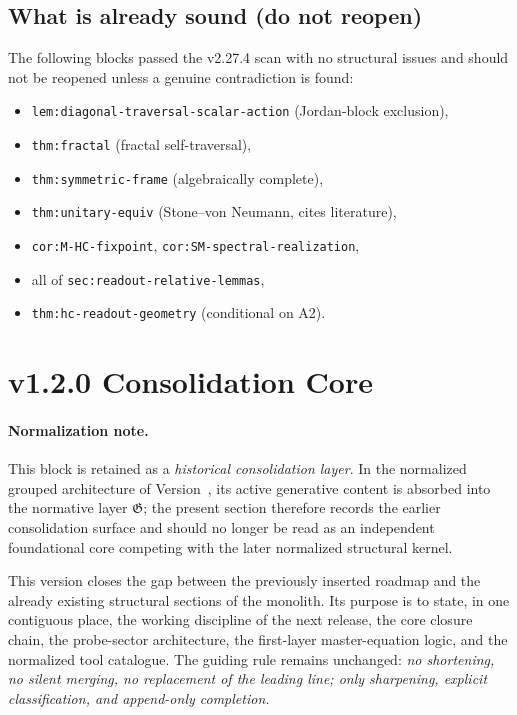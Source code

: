 \subsection*{What is already sound (do not reopen)}

The following blocks passed the v2.27.4 scan with no structural issues and
should not be reopened unless a genuine contradiction is found:
\begin{itemize}[leftmargin=1.8em]
\item \texttt{lem:diagonal-traversal-scalar-action} (Jordan-block exclusion),
\item \texttt{thm:fractal} (fractal self-traversal),
\item \texttt{thm:symmetric-frame} (algebraically complete),
\item \texttt{thm:unitary-equiv} (Stone--von Neumann, cites literature),
\item \texttt{cor:M-HC-fixpoint}, \texttt{cor:SM-spectral-realization},
\item all of \texttt{sec:readout-relative-lemmas},
\item \texttt{thm:hc-readout-geometry} (conditional on A2).
\end{itemize}


\section*{v1.2.0 Consolidation Core}

\paragraph{Normalization note.} This block is retained as a \emph{historical consolidation layer}. In the normalized grouped architecture of Version~\docversion, its active generative content is absorbed into the normative layer $\mathfrak G$; the present section therefore records the earlier consolidation surface and should no longer be read as an independent foundational core competing with the later normalized structural kernel.


This version closes the gap between the previously inserted roadmap and the
already existing structural sections of the monolith. Its purpose is to state,
in one contiguous place, the working discipline of the next release, the core
closure chain, the probe-sector architecture, the first-layer master-equation
logic, and the normalized tool catalogue. The guiding rule remains unchanged:
\emph{no shortening, no silent merging, no replacement of the leading line;
only sharpening, explicit classification, and append-only completion.}

